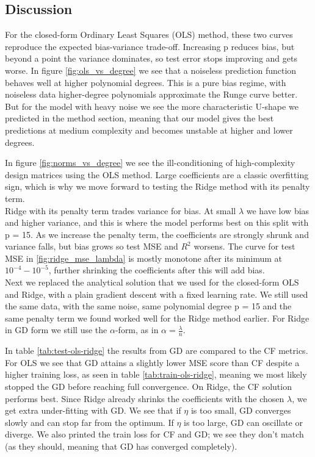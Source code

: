 \documentclass[amssymb,twocolumn,aps]{revtex4-2}
\begin{document}
\subsection{Discussion}

For the closed-form Ordinary Least Squares (OLS) method, these two curves reproduce the expected bias-variance trade-off. Increasing p reduces bias, but beyond a point the variance dominates, so test error stops improving and gets worse. In figure \ref{fig:ols_vs_degree} we see that a noiseless prediction function behaves well at higher polynomial degrees. This is a pure bias regime, with noiseless data higher-degree polynomials approximate the Runge curve better. But for the model with heavy noise we see the more characteristic U-shape we predicted in the method section, meaning that our model gives the best predictions at medium complexity and becomes unstable at higher and lower degrees.

In figure \ref{fig:norms_vs_degree} we see the ill-conditioning of high-complexity design matrices using the OLS method. Large coefficients are a classic overfitting sign, which is why we move forward to testing the Ridge method with its penalty term. \\

Ridge with its penalty term trades variance for bias. At small $\lambda$ we have low bias and higher variance, and this is where the model performs best on this split with p = 15. As we increase the penalty term, the coefficients are strongly shrunk and variance falls, but bias grows so test MSE and $R^2$ worsens. The curve for test MSE in \ref{fig:ridge_mse_lambda} is mostly monotone after its minimum at $10^{-4}-10^{-5}$, further shrinking the coefficients after this will add bias. \\

Next we replaced the analytical solution that we used for the closed-form OLS and Ridge, with a plain gradient descent with a fixed learning rate. We still used the same data, with the same noise, same polynomial degree p = 15 and the same penalty term we found worked well for the Ridge method earlier. For Ridge in GD form we still use the $\alpha$-form, as in $\alpha=\frac{\lambda}{n}$. 

In table \ref{tab:test-ols-ridge} the results from GD are compared to the CF metrics. For OLS we see that GD attains a slightly lower MSE score than CF despite a higher training loss, as seen in table \ref{tab:train-ols-ridge}, meaning we most likely stopped the GD before reaching full convergence. On Ridge, the CF solution performs best. Since Ridge already shrinks the coefficients with the chosen $\lambda$, we get extra under-fitting with GD. We see that if $\eta$ is too small, GD converges slowly and can stop far from the optimum. If $\eta$ is too large, GD can oscillate or diverge. We also printed the train loss for CF and GD; we see they don't match (as they should, meaning that GD has converged completely).
\end{document}
